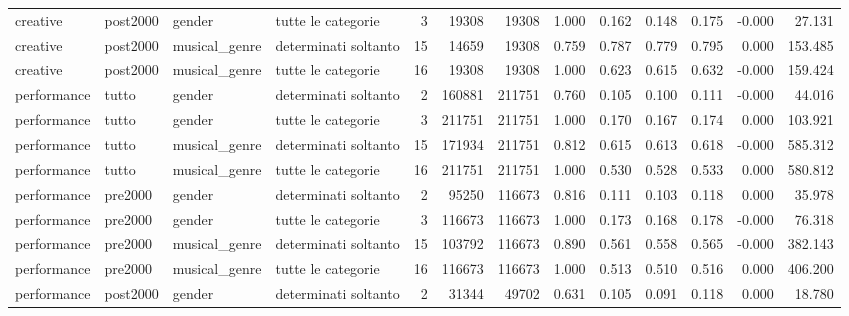 \begin{table}
\begin{tabular}{llllrrrrrrrrr}
   creative & post2000 &        gender &   tutte le categorie &            3 &        19308 &         19308 &              1.000 & 0.162 &  0.148 &  0.175 &  -0.000 &  27.131 \\
   creative & post2000 & musical\_genre & determinati soltanto &           15 &        14659 &         19308 &              0.759 & 0.787 &  0.779 &  0.795 &   0.000 & 153.485 \\
   creative & post2000 & musical\_genre &   tutte le categorie &           16 &        19308 &         19308 &              1.000 & 0.623 &  0.615 &  0.632 &  -0.000 & 159.424 \\
performance &    tutto &        gender & determinati soltanto &            2 &       160881 &        211751 &              0.760 & 0.105 &  0.100 &  0.111 &  -0.000 &  44.016 \\
performance &    tutto &        gender &   tutte le categorie &            3 &       211751 &        211751 &              1.000 & 0.170 &  0.167 &  0.174 &   0.000 & 103.921 \\
performance &    tutto & musical\_genre & determinati soltanto &           15 &       171934 &        211751 &              0.812 & 0.615 &  0.613 &  0.618 &  -0.000 & 585.312 \\
performance &    tutto & musical\_genre &   tutte le categorie &           16 &       211751 &        211751 &              1.000 & 0.530 &  0.528 &  0.533 &   0.000 & 580.812 \\
performance &  pre2000 &        gender & determinati soltanto &            2 &        95250 &        116673 &              0.816 & 0.111 &  0.103 &  0.118 &   0.000 &  35.978 \\
performance &  pre2000 &        gender &   tutte le categorie &            3 &       116673 &        116673 &              1.000 & 0.173 &  0.168 &  0.178 &  -0.000 &  76.318 \\
performance &  pre2000 & musical\_genre & determinati soltanto &           15 &       103792 &        116673 &              0.890 & 0.561 &  0.558 &  0.565 &  -0.000 & 382.143 \\
performance &  pre2000 & musical\_genre &   tutte le categorie &           16 &       116673 &        116673 &              1.000 & 0.513 &  0.510 &  0.516 &   0.000 & 406.200 \\
performance & post2000 &        gender & determinati soltanto &            2 &        31344 &         49702 &              0.631 & 0.105 &  0.091 &  0.118 &   0.000 &  18.780 \\

\end{tabular}
\end{table}
